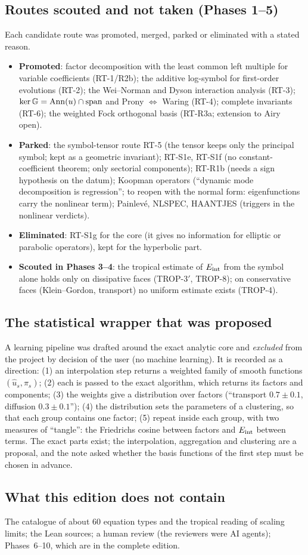 \subsection{Routes scouted and not taken (Phases 1--5)}

Each candidate route was promoted, merged, parked or eliminated with a stated reason.
\begin{itemize}
\item \textbf{Promoted}: factor decomposition with the least common left multiple for variable coefficients (RT-1/R2b); the additive log-symbol for first-order evolutions (RT-2); the Wei--Norman and Dyson interaction analysis (RT-3); $\ker\mathbb G=\operatorname{Ann}(u)\cap\mathrm{span}$ and Prony $\Leftrightarrow$ Waring (RT-4); complete invariants (RT-6); the weighted Fock orthogonal basis (RT-R3a; extension to Airy open).
\item \textbf{Parked}: the symbol-tensor route RT-5 (the tensor keeps only the principal symbol; kept as a geometric invariant); RT-S1e, RT-S1f (no constant-coefficient theorem; only sectorial components); RT-R1b (needs a sign hypothesis on the datum); Koopman operators (``dynamic mode decomposition is regression''; to reopen with the normal form: eigenfunctions carry the nonlinear term); Painlev\'e, NLSPEC, HAANTJES (triggers in the nonlinear verdicts).
\item \textbf{Eliminated}: RT-S1g for the core (it gives no information for elliptic or parabolic operators), kept for the hyperbolic part.
\item \textbf{Scouted in Phases 3--4}: the tropical estimate of $E_{\rm int}$ from the symbol alone holds only on dissipative faces (TROP-3$'$, TROP-8); on conservative faces (Klein--Gordon, transport) no uniform estimate exists (TROP-4).
\end{itemize}

\subsection{The statistical wrapper that was proposed}

A learning pipeline was drafted around the exact analytic core and \emph{excluded} from the project by decision of the user (no machine learning). It is recorded as a direction: (1) an interpolation step returns a weighted family of smooth functions $(\hat u_s,\pi_s)$; (2) each is passed to the exact algorithm, which returns its factors and components; (3) the weights give a distribution over factors (``transport $0.7\pm0.1$, diffusion $0.3\pm0.1$''); (4) the distribution sets the parameters of a clustering, so that each group contains one factor; (5) repeat inside each group, with two measures of ``tangle'': the Friedrichs cosine between factors and $E_{\rm int}$ between terms. The exact parts exist; the interpolation, aggregation and clustering are a proposal, and the note asked whether the basis functions of the first step must be chosen in advance.

\subsection{What this edition does not contain}

The catalogue of about $60$ equation types and the tropical reading of scaling limits; the Lean sources; a human review (the reviewers were AI agents); Phases~6--10, which are in the complete edition.


